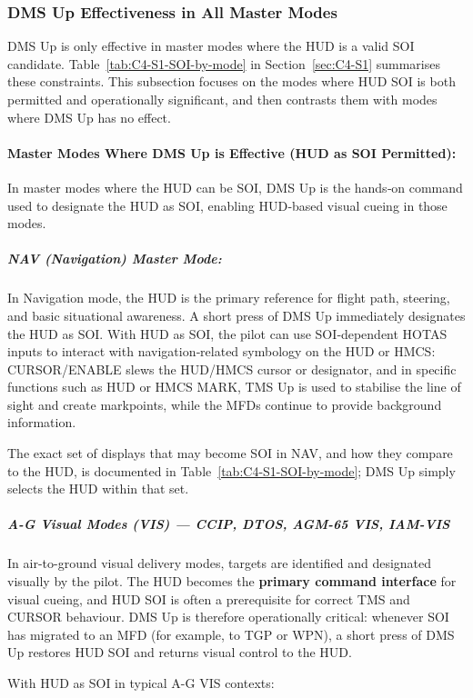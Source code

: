 \documentclass[11pt,a4paper]{article}
\begin{document}
\subsubsection{DMS Up Effectiveness in All Master Modes}
\label{sec:C4-S2-S1}

DMS Up is only effective in master modes where the HUD is a valid SOI candidate. Table~\ref{tab:C4-S1-SOI-by-mode} in Section~\ref{sec:C4-S1} summarises these constraints. This subsection focuses on the modes where HUD SOI is both permitted and operationally significant, and then contrasts them with modes where DMS Up has no effect.

\paragraph*{Master Modes Where DMS Up is Effective (HUD as SOI Permitted):}
In master modes where the HUD can be SOI, DMS Up is the hands‑on command used to designate the HUD as SOI, enabling HUD‑based visual cueing in those modes.

\subparagraph*{NAV (Navigation) Master Mode:}
In Navigation mode, the HUD is the primary reference for flight path, steering, and basic situational awareness. A short press of DMS Up immediately designates the HUD as SOI. With HUD as SOI, the pilot can use SOI‑dependent HOTAS inputs to interact with navigation‑related symbology on the HUD or HMCS: CURSOR/ENABLE slews the HUD/HMCS cursor or designator, and in specific functions such as HUD or HMCS MARK, TMS Up is used to stabilise the line of sight and create markpoints, while the MFDs continue to provide background information.

The exact set of displays that may become SOI in NAV, and how they compare to the HUD, is documented in Table~\ref{tab:C4-S1-SOI-by-mode}; DMS Up simply selects the HUD within that set.

\subparagraph*{A-G Visual Modes (VIS) --- CCIP, DTOS, AGM-65 VIS, IAM-VIS}
In air-to-ground visual delivery modes, targets are identified and designated visually by the pilot. The HUD becomes the \textbf{primary command interface} for visual cueing, and HUD SOI is often a prerequisite for correct TMS and CURSOR behaviour. DMS Up is therefore operationally critical: whenever SOI has migrated to an MFD (for example, to TGP or WPN), a short press of DMS Up restores HUD SOI and returns visual control to the HUD.

With HUD as SOI in typical A-G VIS contexts:
\end{document}
